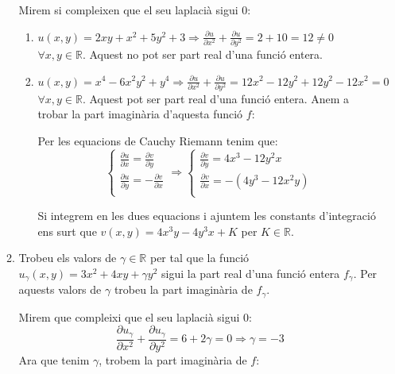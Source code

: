 \documentclass[10pt,a4paper]{article}
\begin{document}
\begin{enumerate}
\begin{enumerate}
	\begin{framed}

	Mirem si compleixen que el seu laplacià sigui 0:
	\begin{enumerate}
	\item $u(x,y)=2xy+x^{2}+5y^{2}+3 \Rightarrow \frac{\partial u}{\partial x^{2}} + \frac{\partial u}{\partial y^{2}} = 2 + 10 = 12\neq 0$ $\forall x,y\in\mathbb{R}$. Aquest no pot ser part real d'una funció entera.
	\item $u(x,y)=x^{4}-6x^{2}y^{2}+y^{4} \Rightarrow \frac{\partial u}{\partial x^{2}} + \frac{\partial u}{\partial y^{2}} = 12x^{2} - 12y^{2} + 12y^{2} - 12x^{2} = 0$ $\forall x,y\in\mathbb{R}$. Aquest pot ser part real d'una funció entera. Anem a trobar la part imaginària d'aquesta funció $f$:
	
	Per les equacions de Cauchy Riemann tenim que:
	$$
	\begin{cases}
		\frac{\partial u}{\partial x} = \frac{\partial v}{\partial y} \\
		\frac{\partial u}{\partial y} = -\frac{\partial v}{\partial x} \\
	\end{cases} \Rightarrow
	\begin{cases}
		\frac{\partial v}{\partial y} = 4x^{3} - 12y^{2}x \\
		\frac{\partial v}{\partial x} = -(4y^{3}-12x^{2}y) \\
	\end{cases}	
	$$	
	
	Si integrem en les dues equacions i ajuntem les constants d'integració ens surt que $v(x,y) = 4x^{3}y - 4y^{3}x + K$ per $K\in\mathbb{R}$.
	
	\end{enumerate}

	\end{framed}
	
	\item Trobeu els valors de $\gamma\in\mathbb{R}$ per tal que la funció $u_{\gamma}(x,y)=3x^{2}+4xy+\gamma y^{2}$ sigui la part real d'una funció entera $f_{\gamma}$. Per aquests valors de $\gamma$ trobeu la part imaginària de $f_{\gamma}$.

	\begin{framed}
		
	Mirem que compleixi que el seu laplacià sigui 0:
	$$\frac{\partial u_{\gamma}}{\partial x^{2}} + \frac{\partial u_{\gamma}}{\partial y^{2}} = 6 + 2\gamma = 0 \Rightarrow \gamma=-3$$
	Ara que tenim $\gamma$, trobem la part imaginària de $f$:
	

\end{framed}
\end{enumerate}
\end{enumerate}
\end{document}
